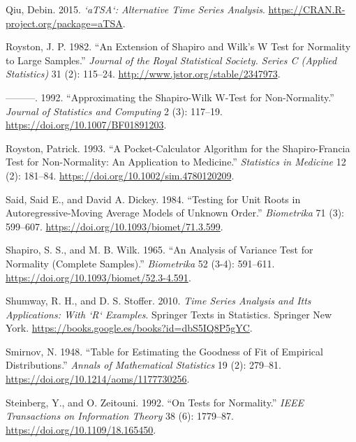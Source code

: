 \begin{CSLReferences}{1}{0}
\leavevmode{}%
Qiu, Debin. 2015. \emph{`aTSA`: Alternative Time Series Analysis}. \url{https://CRAN.R-project.org/package=aTSA}.

\leavevmode{}%
Royston, J. P. 1982. {``An Extension of {S}hapiro and {W}ilk's {W} Test for Normality to Large Samples.''} \emph{Journal of the Royal Statistical Society. Series C (Applied Statistics)} 31 (2): 115--24. \url{http://www.jstor.org/stable/2347973}.

\leavevmode{}%
---------. 1992. {``Approximating the Shapiro-Wilk {W}-Test for Non-Normality.''} \emph{Journal of Statistics and Computing} 2 (3): 117--19. \url{https://doi.org/10.1007/BF01891203}.

\leavevmode{}%
Royston, Patrick. 1993. {``A Pocket-Calculator Algorithm for the {S}hapiro-{F}rancia Test for Non-Normality: An Application to Medicine.''} \emph{Statistics in Medicine} 12 (2): 181--84. \url{https://doi.org/10.1002/sim.4780120209}.

\leavevmode{}%
Said, Said E., and David A. Dickey. 1984. {``Testing for Unit Roots in Autoregressive-Moving Average Models of Unknown Order.''} \emph{Biometrika} 71 (3): 599--607. \url{https://doi.org/10.1093/biomet/71.3.599}.

\leavevmode{}%
Shapiro, S. S., and M. B. Wilk. 1965. {``An Analysis of Variance Test for Normality (Complete Samples).''} \emph{Biometrika} 52 (3-4): 591--611. \url{https://doi.org/10.1093/biomet/52.3-4.591}.

\leavevmode{}%
Shumway, R. H., and D. S. Stoffer. 2010. \emph{Time Series Analysis and Itts Applications: With {`R`} Examples}. Springer Texts in Statistics. Springer New York. \url{https://books.google.es/books?id=dbS5IQ8P5gYC}.

\leavevmode{}%
Smirnov, N. 1948. {``Table for Estimating the Goodness of Fit of Empirical Distributions.''} \emph{Annals of Mathematical Statistics} 19 (2): 279--81. \url{https://doi.org/10.1214/aoms/1177730256}.

\leavevmode{}%
Steinberg, Y., and O. Zeitouni. 1992. {``On Tests for Normality.''} \emph{IEEE Transactions on Information Theory} 38 (6): 1779--87. \url{https://doi.org/10.1109/18.165450}.


\end{CSLReferences}
